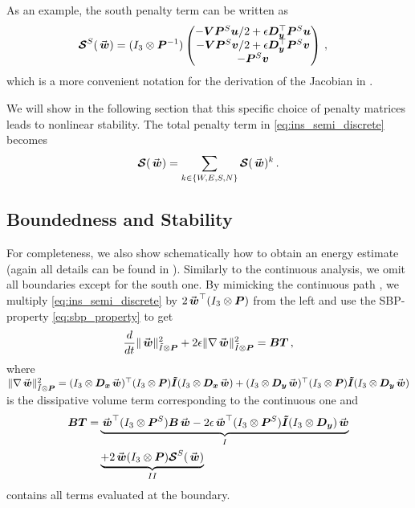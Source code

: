 As an example, the south penalty term can be written as 
\begin{equation}
\begin{aligned}
  \satn^S(\wn) & = 
  (I_3 \otimes \Pn^{-1})
  \begin{pmatrix}
     -\Vn\Pn^S\un/2 + \epsilon \Dy^\top\Pn^S\un
     \\
     -\Vn\Pn^S\vn/2 + \epsilon \Dy^\top\Pn^S\vn
     \\
     -\Pn^S \vn
  \end{pmatrix}
  \, ,
  \label{eq:SatS}
\end{aligned}
\end{equation}
which is a more convenient notation for the derivation of the Jacobian in .

We will show in the following section that this specific choice of penalty matrices leads to nonlinear stability.
The total penalty term in \eqref{eq:ins_semi_discrete} becomes
\begin{equation}
  \satn(\wn) = \sum_{k\in\{W,E,S,N\}} \satn(\wn)^k
  \, .
  \label{eq:total_penalty}
\end{equation}

\subsection{Boundedness and Stability}
For completeness, we also show schematically how to obtain an energy estimate (again all details can be found in \cite{nordstrom2019energy}). Similarly to the continuous analysis, we omit all boundaries except for the south one. By mimicking the continuous path \cite{nordstrom2017roadmap}, we multiply \eqref{eq:ins_semi_discrete} by $2\wn^\top (I_3\otimes \Pn)$ from the left and use the SBP-property \eqref{eq:sbp_property} to get
\begin{equation}
  \frac{d}{dt}\|\wn\|^2_{\It\otimes \Pn} 
  + 2\epsilon \|\nabla \wn\|^2_{\It\otimes \Pn} = \BTn
  \, ,
  \label{eq:energy}
\end{equation}
where $\|\nabla \wn\|^2_{\It\otimes \Pn} = (I_3\otimes \Dx \wn)^\top (I_3\otimes \Pn)\Itn(I_3\otimes \Dx \wn) + (I_3\otimes \Dy \wn)^\top (I_3\otimes \Pn)\Itn(I_3\otimes \Dy \wn)$ is the dissipative volume term corresponding to the continuous one and 
\begin{equation}
\begin{aligned}
  \bm{BT} = & 
  \underbrace{
  \wn^\top(I_3 \otimes \Pn^S)\Bn\wn - 2\epsilon \wn^\top (I_3\otimes \Pn^S)\Itn (I_3 \otimes \Dy) \wn}_I
  \\
  & 
  \underbrace{
  + 
  2 \wn (I_3\otimes \Pn) \satn^S(\wn)}_{II}
  \label{eq:BT}
\end{aligned}
\end{equation}
contains all terms evaluated at the boundary. 


